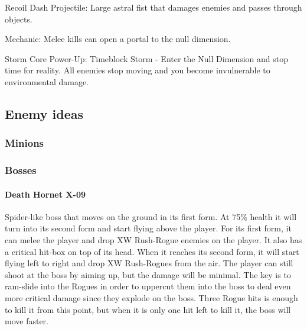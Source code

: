 \documentclass[../Main.tex]{subfiles}
\begin{document}
Recoil Dash Projectile: Large astral fist that damages enemies and passes through objects. 

Mechanic: Melee kills can open a portal to the null dimension. 

Storm Core Power-Up: Timeblock Storm - Enter the Null Dimension and stop time for reality. All enemies stop moving and you become invulnerable to environmental damage. 

\subsection{Enemy ideas}

\subsubsection{Minions}

\subsubsection{Bosses}

\paragraph{Death Hornet X-09}

Spider-like boss that moves on the ground in its first form. At 75\% health it will turn into its second form and start flying above the player. For its first form, it can melee the player and drop XW Rush-Rogue enemies on the player. It also has a critical hit-box on top of its head. When it reaches its second form, it will start flying left to right and drop XW Rush-Rogues from the air. The player can still shoot at the boss by aiming up, but the damage will be minimal. The key is to ram-slide into the Rogues in order to uppercut them into the boss to deal even more critical damage since they explode on the boss. Three Rogue hits is enough to kill it from this point, but when it is only one hit left to kill it, the boss will move faster. 
\end{document}
